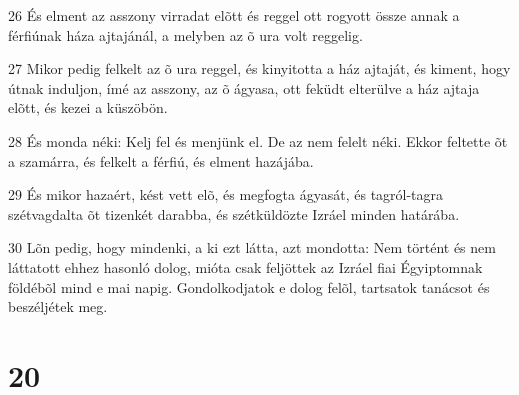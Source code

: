 \par 26 És elment az asszony virradat elõtt és reggel ott rogyott össze annak a férfiúnak háza ajtajánál, a melyben az õ ura volt reggelig.
\par 27 Mikor pedig felkelt az õ ura reggel, és kinyitotta a ház ajtaját, és kiment, hogy útnak induljon, ímé az asszony, az õ ágyasa, ott feküdt elterülve a ház ajtaja elõtt, és kezei a küszöbön.
\par 28 És monda néki: Kelj fel és menjünk el. De az nem felelt néki. Ekkor feltette õt a szamárra, és felkelt a férfiú, és elment hazájába.
\par 29 És mikor hazaért, kést vett elõ, és megfogta ágyasát, és tagról-tagra szétvagdalta õt tizenkét darabba, és szétküldözte Izráel minden határába.
\par 30 Lõn pedig, hogy mindenki, a ki ezt látta, azt mondotta: Nem történt és nem láttatott ehhez hasonló dolog, mióta csak feljöttek az Izráel fiai Égyiptomnak földébõl mind e mai napig. Gondolkodjatok e dolog felõl, tartsatok tanácsot és beszéljétek meg.

\chapter{20}

